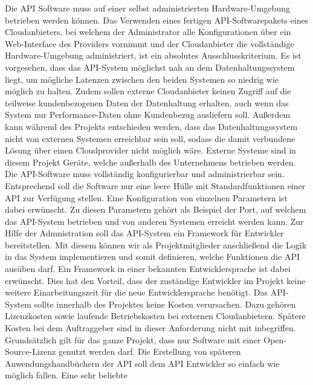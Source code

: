 \begin{outline}
  \1 Die \gls{API} Software muss auf einer selbst administrierten
  Hardware\hyp{}Umgebung betrieben werden können. Das Verwenden eines fertigen
  \gls{API}\hyp{}Softwarepakets eines Cloudanbieters, bei welchem der
  Administrator alle Konfigurationen über ein Web\hyp{}Interface des Providers
  vornimmt und der Cloudanbieter die vollständige Hardware\hyp{}Umgebung
  administriert, ist ein absolutes Ausschlusskriterium. Es ist vorgesehen, dass
  das \gls{API}\hyp{}System möglichst nah an dem Datenhaltungssystem liegt, um
  mögliche Latenzen zwischen den beiden Systemen so niedrig wie möglich zu
  halten. Zudem sollen externe Cloudanbieter keinen Zugriff auf die teilweise
  kundenbezogenen Daten der Datenhaltung erhalten, auch wenn das System nur
  Performance\hyp{}Daten ohne Kundenbezug ausliefern soll. Außerdem kann
  während des Projekts entschieden werden, dass das Datenhaltungssystem nicht
  von externen Systemen erreichbar sein soll, sodass die damit verbundene
  Lösung über einen Cloudprovider nicht möglich wäre. Externe Systeme sind in
  diesem Projekt Geräte, welche außerhalb des Unternehmens betrieben werden.
  \1 Die \gls{API}\hyp{}Software muss vollständig konfigurierbar und
  administrierbar sein. Entsprechend soll die Software nur eine leere Hülle
  mit Standardfunktionen einer \gls{API} zur Verfügung stellen. Eine
  Konfiguration von einzelnen Parametern ist dabei erwünscht. Zu diesen
  Parametern gehört als Beispiel der Port, auf welchem das
  \gls{API}\hyp{}System betrieben und von anderen Systemen erreicht werden
  kann. Zur Hilfe der Admnistration soll das \gls{API}\hyp{}System ein
  Framework für Entwickler bereitstellen. Mit diesem können wir als
  Projektmitglieder anschließend die Logik in das System implementieren
  und somit definieren, welche Funktionen die \gls{API} ausüben darf. Ein
  Framework in einer bekannten Entwicklersprache ist dabei erwünscht. Dies hat
  den Vorteil, dass der zuständige Entwickler im Projekt keine weitere
  Einarbeitungszeit für die neue Entwicklersprache benötigt.
  \1 Das \gls{API}\hyp{}System sollte innerhalb des Projektes keine Kosten
  verursachen. Dazu gehören Lizenzkosten sowie laufende Betriebskosten bei
  externen Cloudanbietern. Spätere Kosten bei dem Auftraggeber sind in dieser
  Anforderung nicht mit inbegriffen. Grundsätzlich gilt für das ganze Projekt,
  dass nur Software mit einer Open\hyp{}Source\hyp{}Lizenz genutzt werden darf.
  \1 Die Erstellung von späteren Anwendungshandbüchern der \gls{API} soll dem
  \gls{API} Entwickler so einfach wie möglich fallen. Eine sehr beliebte

\end{outline}
